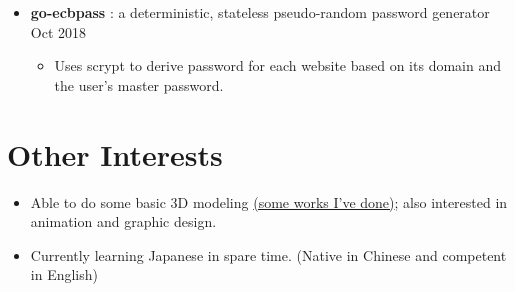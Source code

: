 \documentclass[a4paper]{article}
\begin{document}
\begin{itemize}
    \item \textbf{go-ecbpass} : a deterministic, stateless pseudo-random password generator \dashdiv{} Oct 2018

    \begin{itemize}
      \item Uses scrypt to derive password for each website based on its domain and the user's master password.
    \end{itemize}

  \end{itemize}

  \section{Other Interests}

  \begin{itemize}[itemsep=0.1\parskip]
    \item Able to do some basic 3D modeling \href{https://maowtm.org/Artworks/}{\color{link}(some works I've done)}; also interested in animation and graphic design.
    \item Currently learning Japanese in spare time. (Native in Chinese and competent in English)
  \end{itemize}
\end{document}

